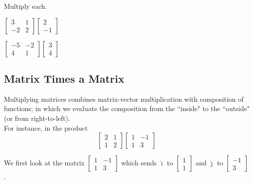 \documentclass{article}
\begin{document}
\begin{example}
Multiply each.
\begin{enumerate}[(a)]
\begin{multicols}{2}
    \item $\begin{bmatrix}
        3 & 1 \\
        -2 & 2
    \end{bmatrix}
    \begin{bmatrix} 2 \\ -1 \end{bmatrix}$
    
    \item $\begin{bmatrix}
        -5 & -2 \\
        4 & 1 
    \end{bmatrix}
\begin{bmatrix}
        3 \\ 4
\end{bmatrix}$
\end{multicols}
\end{enumerate}
\end{example}

\vfill 
\newpage 

\subsection*{Matrix Times a Matrix}

Multiplying matrices combines matrix-vector multiplication with composition of functions; in which we evaluate the composition from the ``inside" to the ``outside" (or from right-to-left). \newline\\

For instance, in the product
\[
\begin{bmatrix} 2 & 1 \\ 1 & 2 \end{bmatrix} \begin{bmatrix}
1 & -1 \\ 1 & 3
\end{bmatrix}
\]
\bigskip 

We first look at the matrix $\begin{bmatrix} 1 & -1 \\ 1 & 3 \end{bmatrix}$ which sends $\hat{\imath}$ to $\begin{bmatrix} 1 \\ 1 \end{bmatrix}$ and $\hat{\jmath}$ to $\begin{bmatrix}
-1 \\ 3
\end{bmatrix}$. \vspace{0.25in}
\end{document}
